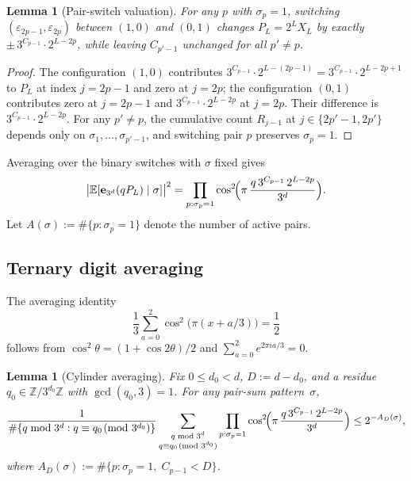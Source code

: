 \documentclass[11pt,a4paper]{amsart}
\theoremstyle{plain}
\newtheorem{lemma}[theorem]{Lemma}
\theoremstyle{definition}
\newcommand{\Z}{\mathbb{Z}}
\newcommand{\E}{\mathbb{E}}
\begin{document}
\begin{lemma}[Pair-switch valuation]\label{lem:switch}
For any $p$ with $\sigma_p=1$, switching $(\varepsilon_{2p-1},\varepsilon_{2p})$
between $(1,0)$ and $(0,1)$ changes $P_L=2^L X_L$ by exactly
$\pm\,3^{C_{p-1}}\cdot 2^{L-2p}$, while leaving $C_{p'-1}$ unchanged for
all $p'\ne p$.
\end{lemma}

\begin{proof}
The configuration $(1,0)$ contributes $3^{C_{p-1}}\cdot 2^{L-(2p-1)}
=3^{C_{p-1}}\cdot 2^{L-2p+1}$ to $P_L$ at index $j=2p-1$ and zero at
$j=2p$;
the configuration $(0,1)$ contributes zero at $j=2p-1$ and
$3^{C_{p-1}}\cdot 2^{L-2p}$ at $j=2p$.
Their difference is $3^{C_{p-1}}\cdot 2^{L-2p}$.
For any $p'\ne p$, the cumulative count $R_{j-1}$ at $j\in\{2p'-1,2p'\}$
depends only on $\sigma_1,\dots,\sigma_{p'-1}$, and switching pair $p$
preserves $\sigma_p=1$.
\end{proof}

Averaging over the binary switches with $\sigma$ fixed gives
\begin{equation}\label{eq:condbound}
\bigl|\E[\mathbf e_{3^d}(qP_L)\mid\sigma]\bigr|^2
=\prod_{p:\sigma_p=1}\cos^2\!\Bigl(\pi\,\frac{q\,3^{C_{p-1}}\,2^{L-2p}}{3^d}\Bigr).
\end{equation}
Let $A(\sigma):=\#\{p:\sigma_p=1\}$ denote the number of active pairs.

\subsection{Ternary digit averaging}
The averaging identity
\begin{equation}\label{eq:digit}
\frac13\sum_{a=0}^2\cos^2\!\bigl(\pi(x+a/3)\bigr)=\frac12
\end{equation}
follows from $\cos^2\theta=(1+\cos 2\theta)/2$ and
$\sum_{a=0}^2 e^{2\pi ia/3}=0$.

\begin{lemma}[Cylinder averaging]\label{lem:cylavg}
Fix $0\le d_0<d$, $D:=d-d_0$, and a residue $q_0\in\Z/3^{d_0}\Z$
with $\gcd(q_0,3)=1$.
For any pair-sum pattern~$\sigma$,
\begin{equation}\label{eq:cylavg}
\frac{1}{\#\{q\bmod 3^d:q\equiv q_0\!\!\pmod{3^{d_0}}\}}
\sum_{\substack{q\bmod 3^d\\q\equiv q_0\!\!\pmod{3^{d_0}}}}
\prod_{p:\sigma_p=1}\cos^2\!\Bigl(\pi\,\frac{q\,3^{C_{p-1}}\,2^{L-2p}}{3^d}\Bigr)
\le 2^{-A_D(\sigma)},
\end{equation}
where $A_D(\sigma):=\#\{p:\sigma_p=1,\;C_{p-1}<D\}$.
\end{lemma}
\end{document}
